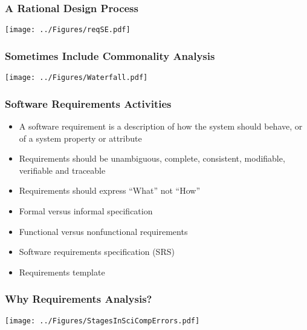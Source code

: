 \documentclass[t,12pt,numbers,fleqn]{beamer}
\begin{document}

\begin{frame}
\frametitle{A Rational Design Process}
\begin{center}
 \texttt{[image: ../Figures/reqSE.pdf]}
\end{center}
\end{frame}


\begin{frame}
\frametitle{Sometimes Include Commonality Analysis}
\begin{center}
 \texttt{[image: ../Figures/Waterfall.pdf]}
\end{center}
\end{frame}


\begin{frame}
\frametitle{Software Requirements Activities}
\begin{itemize}
\item A software requirement is a description of how the system should behave, or of a system property or attribute
\item Requirements should be unambiguous, complete, consistent, modifiable, verifiable and traceable
\item Requirements should express ``What'' not ``How''
\item Formal versus informal specification
\item Functional versus nonfunctional requirements
\item Software requirements specification (SRS)
\item Requirements template
\end{itemize}
\end{frame}


\begin{frame}
\frametitle{Why Requirements Analysis?}
\begin{center}
 \texttt{[image: ../Figures/StagesInSciCompErrors.pdf]}
\end{center}
\end{frame}
\end{document}
